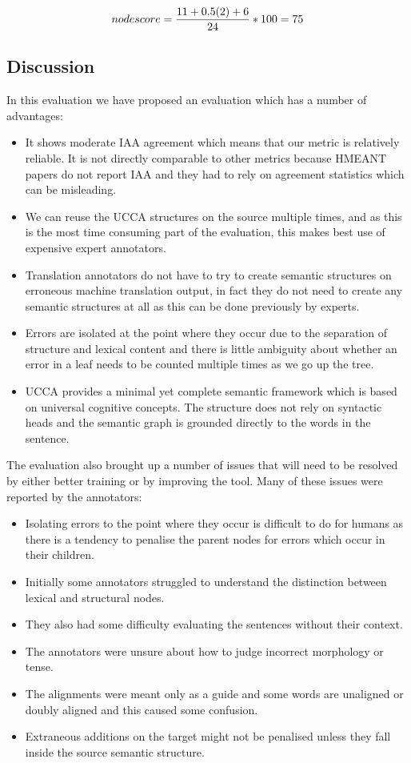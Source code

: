 \documentclass[11pt]{article}
\begin{document}
\begin{displaymath}
node score = \frac{ 11  + 0.5 ( 2 ) + 6  } { 24  } * 100\\
                    = 75
\end{displaymath}

\subsection{Discussion}

In this evaluation we have proposed an evaluation which has a number of advantages:
\begin{itemize}
\item  It shows moderate IAA agreement which means that our metric is relatively reliable. It is not directly comparable to other metrics because HMEANT papers do not report IAA and they had to rely on agreement statistics which can be misleading. 
\item  We can reuse the UCCA structures on the source multiple times, and as this is the most time consuming part
of the evaluation, this makes best use of expensive expert annotators. 
\item Translation annotators do not have to try to create semantic structures on erroneous machine translation output, in fact
they do not need to create any semantic structures at all as this can be done previously by experts.
\item Errors are isolated at the point where they occur due to the separation of structure and lexical content and there
is little ambiguity about whether an error in a leaf needs to be counted multiple times as we go up the tree. 
\item UCCA provides a minimal yet complete semantic framework which is based on universal cognitive concepts. 
The structure does not rely on syntactic heads and the semantic graph is grounded directly to the words in the sentence. 
\end{itemize}

The evaluation also brought up a number of issues that will need to be resolved by either better  training or
by improving the tool. Many of these issues were reported by the annotators:
\begin{itemize}
\item Isolating errors to the point where they occur is difficult to do for humans as there is a tendency to
penalise the parent nodes for errors which occur in their children. 
\item Initially some annotators struggled to understand the distinction between lexical and structural nodes. 
\item They also had some difficulty evaluating the 
sentences
without their context. 
\item The annotators were unsure about how to judge incorrect morphology or tense. 
\item  The alignments were meant only as a guide and some words are unaligned or doubly aligned and this
caused some confusion. 
\item Extraneous additions on the target might not be penalised unless they fall inside the source
semantic structure.
\end{itemize}
\end{document}
